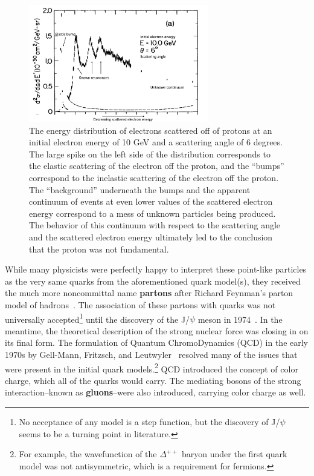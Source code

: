 \begin{figure}[ht]
    \centering
    \includegraphics[width=0.7\textwidth]{figures/introduction/DeepInelasticScattering.png}
    \caption{The energy distribution of electrons scattered off of protons at an initial electron energy of 10 GeV and a scattering angle of 6 degrees. The large spike on the left side of the distribution corresponds to the elastic scattering of the electron off the proton, and the ``bumps'' correspond to the inelastic scattering of the electron off the proton. The ``background'' underneath the bumps and the apparent continuum of events at even lower values of the scattered electron energy correspond to a mess of unknown particles being produced. The behavior of this continuum with respect to the scattering angle and the scattered electron energy ultimately led to the conclusion that the proton was not fundamental.}
    \label{fig:dis}
\end{figure}

While many physicists were perfectly happy to interpret these point-like particles as the very same quarks from the aforementioned quark model(s), they received the much more noncommittal name \textbf{partons} after Richard Feynman's parton model of hadrons~\cite{Partons}. The association of these partons with quarks was not universally accepted\footnote{No acceptance of any model is a step function, but the discovery of J/$\psi$ seems to be a turning point in literature.} until the discovery of the J/$\psi$ meson in 1974~\cite{Jpsi}. In the meantime, the theoretical description of the strong nuclear force was closing in on its final form. The formulation of Quantum ChromoDynamics (QCD) in the early 1970s by Gell-Mann, Fritzsch, and Leutwyler~\cite{QCDFormulation} resolved many of the issues that were present in the initial quark models.\footnote{For example, the wavefunction of the $\Delta^{++}$ baryon under the first quark model was not antisymmetric, which is a requirement for fermions.} QCD introduced the concept of color charge, which all of the quarks would carry. The mediating bosons of the strong interaction--known as \textbf{gluons}--were also introduced, carrying color charge as well.

